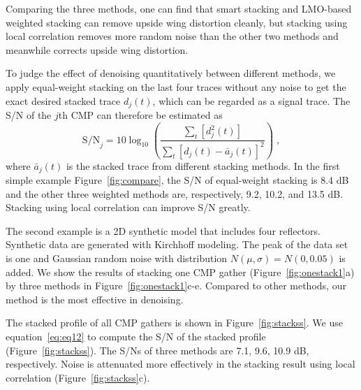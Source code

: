 Comparing the three methods, one can find that smart stacking
and LMO-based weighted stacking can remove upside wing distortion
cleanly, but stacking using local correlation removes more random
noise than the other two methods and meanwhile corrects upside
wing distortion.

To judge the effect of denoising quantitatively between different
methods, we apply equal-weight stacking on the last four traces
without any noise to get the exact desired stacked trace $d_j(t)$, which
can be regarded as a signal trace. The S/N of the $j$th CMP can therefore
be estimated as
      \begin{equation}
          \textrm{S/N}_j = 10 \log_{10} \left(\frac{\displaystyle\sum_t[d^2_j(t)]}{\displaystyle\sum_t[d_j(t)-\bar{a}_j(t)]^2} \right) \;,
        \label{eq:eq12}
      \end{equation}
where $\bar{a}_j(t)$ is the stacked trace from different
stacking methods. In the first simple example
Figure~\ref{fig:compare}, the S/N of equal-weight stacking is
8.4 dB and the other three weighted methods are,
respectively, 9.2, 10.2, and 13.5 dB. Stacking using
local correlation can improve S/N greatly.

The second example is a 2D synthetic model
that includes four reflectors. Synthetic data are
generated with Kirchhoff modeling. The peak of
the data set is one and Gaussian random noise
with distribution $N(\mu,\sigma)=N(0,0.05)$ is added.
We show the results of stacking one CMP gather
(Figure~\ref{fig:onestack1}a) by three methods in 
Figure~\ref{fig:onestack1}c-e.
Compared to other methods, our method is the
most effective in denoising.

The stacked profile of all CMP gathers is
shown in Figure~\ref{fig:stackss}. We use equation~\ref{eq:eq12} to compute
the S/N of the stacked profile (Figure~\ref{fig:stackss}). The
S/Ns of three methods are 7.1, 9.6, 10.9 dB, respectively.
Noise is attenuated more effectively in
the stacking result using local correlation (Figure~\ref{fig:stackss}c).

